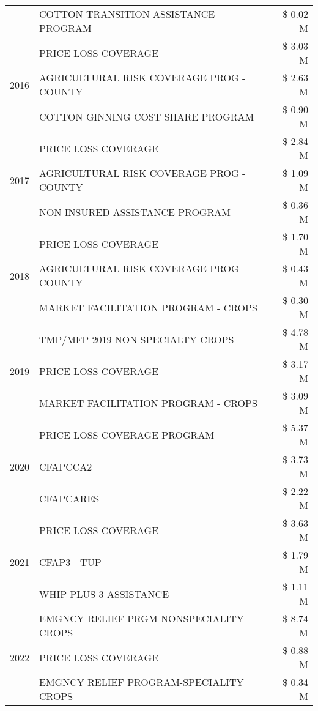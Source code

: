 \begin{tabular}{llr}
 & COTTON TRANSITION ASSISTANCE PROGRAM & \$ 0.02 M \\
\cline{1-3}
\multirow[t]{3}{*}{2016} & PRICE LOSS COVERAGE & \$ 3.03 M \\
 & AGRICULTURAL RISK COVERAGE PROG - COUNTY & \$ 2.63 M \\
 & COTTON GINNING COST SHARE PROGRAM & \$ 0.90 M \\
\cline{1-3}
\multirow[t]{3}{*}{2017} & PRICE LOSS COVERAGE & \$ 2.84 M \\
 & AGRICULTURAL RISK COVERAGE PROG - COUNTY & \$ 1.09 M \\
 & NON-INSURED ASSISTANCE PROGRAM & \$ 0.36 M \\
\cline{1-3}
\multirow[t]{3}{*}{2018} & PRICE LOSS COVERAGE & \$ 1.70 M \\
 & AGRICULTURAL RISK COVERAGE PROG - COUNTY & \$ 0.43 M \\
 & MARKET FACILITATION PROGRAM - CROPS & \$ 0.30 M \\
\cline{1-3}
\multirow[t]{3}{*}{2019} & TMP/MFP 2019 NON SPECIALTY CROPS & \$ 4.78 M \\
 & PRICE LOSS COVERAGE & \$ 3.17 M \\
 & MARKET FACILITATION PROGRAM - CROPS & \$ 3.09 M \\
\cline{1-3}
\multirow[t]{3}{*}{2020} & PRICE LOSS COVERAGE PROGRAM & \$ 5.37 M \\
 & CFAPCCA2 & \$ 3.73 M \\
 & CFAPCARES & \$ 2.22 M \\
\cline{1-3}
\multirow[t]{3}{*}{2021} & PRICE LOSS COVERAGE & \$ 3.63 M \\
 & CFAP3 - TUP & \$ 1.79 M \\
 & WHIP PLUS 3 ASSISTANCE & \$ 1.11 M \\
\cline{1-3}
\multirow[t]{3}{*}{2022} & EMGNCY RELIEF PRGM-NONSPECIALITY CROPS & \$ 8.74 M \\
 & PRICE LOSS COVERAGE & \$ 0.88 M \\
 & EMGNCY RELIEF PROGRAM-SPECIALITY CROPS & \$ 0.34 M \\
\cline{1-3}
\bottomrule
\end{tabular}
